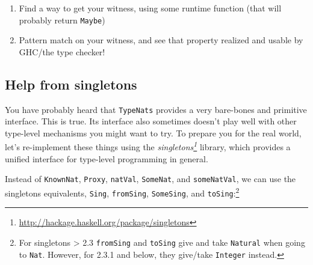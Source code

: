 \documentclass[]{article}
\renewcommand{\href}[2]{#2\footnote{\url{#1}}}
\begin{document}
\begin{enumerate}
\def\labelenumi{\arabic{enumi}.}
\tightlist
\item
  Find a way to get your witness, using some runtime function (that will
  probably return \texttt{Maybe})
\item
  Pattern match on your witness, and see that property realized and usable by
  GHC/the type checker!
\end{enumerate}

\hypertarget{help-from-singletons}{%
\subsection{Help from singletons}\label{help-from-singletons}}

You have probably heard that \texttt{TypeNats} provides a very bare-bones and
primitive interface. This is true. Its interface also sometimes doesn't play
well with other type-level mechanisms you might want to try. To prepare you for
the real world, let's re-implement these things using the
\emph{\href{http://hackage.haskell.org/package/singletons}{singletons}} library,
which provides a unified interface for type-level programming in general.

Instead of \texttt{KnownNat}, \texttt{Proxy}, \texttt{natVal}, \texttt{SomeNat},
and \texttt{someNatVal}, we can use the singletons equivalents, \texttt{Sing},
\texttt{fromSing}, \texttt{SomeSing}, and \texttt{toSing}:\footnote{For
  singletons \textgreater{} 2.3 \texttt{fromSing} and \texttt{toSing} give and
  take \texttt{Natural} when going to \texttt{Nat}. However, for 2.3.1 and
  below, they give/take \texttt{Integer} instead.}
\end{document}
